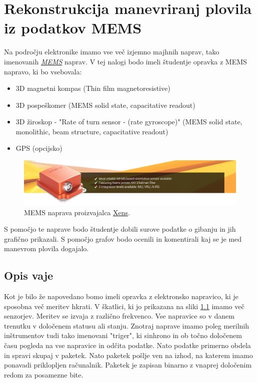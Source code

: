 %
\chapter{Rekonstrukcija manevriranj plovila iz podatkov MEMS}
\label{Vaje:RekonsMems} %

Na področju elektronike imamo vse več izjemno majhnih naprav, tako imenovanih \href{https://en.wikipedia.org/wiki/Microelectromechanical_systems}{\textit{MEMS}} naprav. V tej nalogi bodo imeli študentje opravka z MEMS napravo, ki bo vsebovala:
\begin{itemize}
	\item 3D magnetni kompas (Thin film magnetoresistive)
	\item 3D pospeškomer (MEMS solid state, capacitative readout)
	\item 3D žiroskop - "Rate of turn sensor - (rate gyroscope)" (MEMS solid state, monolithic, beam structure, capacitative readout)
	\item GPS (opcijsko)
\end{itemize}

\begin{figure}[!h]
	\centering \includegraphics[width=12cm]{Vaje/ManevrZMems/figs/mems_photo.png}
	\caption{MEMS naprava proizvajalca \href{https://www.xsens.com}{Xens}.}
	\label{fig:v_mems_photo}
\end{figure}

S pomočjo te naprave bodo študentje dobili surove podatke o gibanju in jih grafično prikazali. S pomočjo grafov bodo ocenili in komentirali kaj se je med manevrom plovila dogajalo.


\section{Opis vaje}
\label{sec:v_mems_uvod}
Kot je bilo že napovedano bomo imeli opravka z elektronsko napravico, ki je sposobna več meritev hkrati. V škatlici, ki jo prikazana na sliki \ref{fig:v_mems_photo} imamo več senzorjev. Meritev se izvaja z različno frekvenco. Vse napravice so v danem trenutku v določenem statusu ali stanju. Znotraj naprave imamo poleg merilnih inštrumentov tudi tako imenovani "triger", ki sinhrono in ob točno določenem času pogleda na vse napravice in odčita podatke. Nato podatke primerno obdela in spravi skupaj v paketek. Nato paketek pošlje ven na izhod, na katerem imamo ponavadi priklopljen računalnik. Paketek je zapisan binarno z vnaprej določenim redom za posamezne bite.

